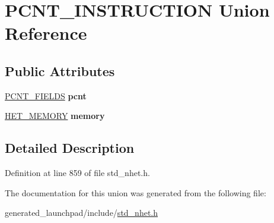 \hypertarget{unionPCNT__INSTRUCTION}{}\section{P\+C\+N\+T\+\_\+\+I\+N\+S\+T\+R\+U\+C\+T\+I\+ON Union Reference}
\label{unionPCNT__INSTRUCTION}
\subsection*{Public Attributes}
\begin{DoxyCompactItemize}
\item 
\mbox{\label{unionPCNT__INSTRUCTION_a49a9dba4bca3d6d04c5569963fa1f561}} 
\mbox{\hyperlink{structpcnt__format}{P\+C\+N\+T\+\_\+\+F\+I\+E\+L\+DS}} {\bfseries pcnt}
\item 
\mbox{\label{unionPCNT__INSTRUCTION_abbfb0e4589f70d019f4b9e1c1fff03ad}} 
\mbox{\hyperlink{structmemory__format}{H\+E\+T\+\_\+\+M\+E\+M\+O\+RY}} {\bfseries memory}
\end{DoxyCompactItemize}


\subsection{Detailed Description}


Definition at line 859 of file std\+\_\+nhet.\+h.



The documentation for this union was generated from the following file\+:\begin{DoxyCompactItemize}
\item 
generated\+\_\+launchpad/include/\mbox{\hyperlink{std__nhet_8h}{std\+\_\+nhet.\+h}}\end{DoxyCompactItemize}

